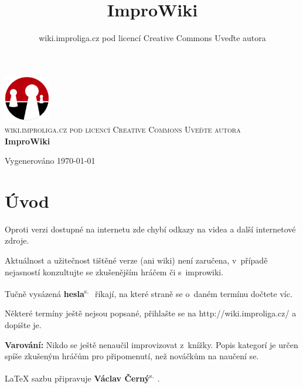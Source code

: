 \documentclass[a4paper,10pt,openany]{book}
\title{ImproWiki}
\author{wiki.improliga.cz pod licencí Creative Commons Uveďte autora}
\newcommand{\odkaz}[2]{\textbf{#1}\textsuperscript{s.~\pageref{#2}}}
\begin{document}
\begin{titlepage}
\begin{center}

\includegraphics[width=0.15\textwidth]{./improliga}~\\[5cm]

\textsc{\Large wiki.improliga.cz pod licencí Creative Commons Uveďte autora }\\[0.5cm]

{ \huge \bfseries ImproWiki \\[0.4cm] }



\vfill

{\large Vygenerováno \today}

\end{center}




\end{titlepage}


\chapter{Úvod}\label{úvod}



Oproti verzi dostupné na internetu zde chybí odkazy na videa a další internetové zdroje.

Aktuálnost a užitečnost tištěné verze (ani wiki) není zaručena, v~případě nejasností konzultujte se zkušenějším hráčem či s~improwiki.

Tučně vysázená \odkaz{hesla}{úvod} říkají, na které straně se o~daném termínu dočtete víc.

Některé termíny ještě nejsou popsané, přihlašte se na http://wiki.improliga.cz/ a dopište je.

\textbf{Varování:} Nikdo se ještě nenaučil improvizovat z~knížky. Popis kategorí je určen spíše zkušeným hráčům pro připomenutí, než nováčkům na naučení se.

\LaTeX{} sazbu připravuje  \odkaz{Václav Černý}{uživatel:vatoz}.
\end{document}
